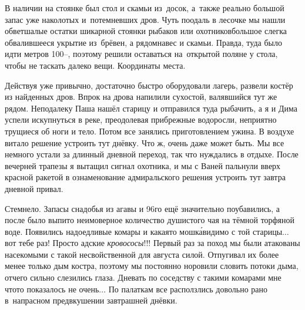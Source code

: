 В наличии на стоянке был стол и скамьи из~досок, а~также реально большой запас уже наколотых и~потемневших дров. Чуть поодаль в лесочке мы нашли обветшалые остатки шикарной стоянки рыбаков или охотников\mdash  большое слегка обвалившееся укрытие из~брёвен, а рядом\mdash  навес и скамьи. Правда, туда было идти метров 100\thinspace\nobreakdash--, поэтому решили оставаться на~открытой поляне у стола, чтобы не таскать далеко вещи. Координаты места\mdash \CoordsChagodoschaSixteenNearKaban. 

Действуя уже привычно, достаточно быстро оборудовали лагерь, развели костёр из найденных дров. Впрок на дрова напилили сухостой, валявшийся тут же рядом. Неподалеку Паша нашёл старицу и отправился туда рыбачить, а я и Дима успели искупнуться в реке, преодолевая прибрежные водоросли, неприятно трущиеся об ноги и тело. Потом все занялись приготовлением ужина. В воздухе витало решение устроить тут днёвку. Что ж, очень даже может быть. Мы все немного устали за длинный дневной переход, так что нуждались в отдыхе. После вечерней трапезы я вытащил сигнал охотника, и мы с Ваней пальнули вверх красной ракетой в ознаменование адмиральского решения устроить тут завтра дневной привал.

Стемнело. Запасы снадобья из агавы и 96\sdash го ещё значительно поубавились, а после было выпито неимоверное количество душистого чая на тёмной торфяной воде. Появились надоедливые комары и какая\sdash то мошк\'{а}\mdash  видимо с той старицы$\ldots$ вот тебе раз! Просто адские \textit{кровососы}!!! Первый раз за поход мы были атакованы насекомыми с такой несвойственной для августа силой. Отпугивал их более менее только дым костра, поэтому мы постоянно норовили словить потоки дыма, отчего сильно слезились глаза. Дневать по соседству с такими комарами мне что\sdash то показалось не очень$\ldots$ По палаткам все расползлись довольно рано в~напрасном предвкушении завтрашней днёвки. 

\begin{center}
\end{center}
